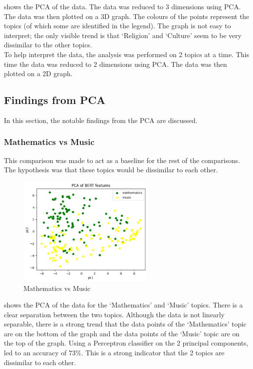  shows the PCA of the data. The data was reduced to 3 dimensions using PCA. The data was then plotted on a 3D
graph. The colours of the points represent the topics (of which some are identified in the legend). The graph is not easy to interpret;
the only visible trend is that `Religion' and `Culture' seem to be very dissimilar to the other topics.\\
To help interpret the data, the analysis was performed on 2 topics at a time. This time the data was reduced to 2 dimensions using
PCA. The data was then plotted on a 2D graph.
\subsection{Findings from PCA}
In this section, the notable findings from the PCA are discussed.
\subsubsection{Mathematics vs Music}
This comparison was made to act as a baseline for the rest of the comparisons. The hypothesis was that these topics would be
dissimilar to each other.
\begin{figure}[hbtp]
    \centering
    \includegraphics[width=0.6\textwidth]{../images/math-vs-music.png}
    \caption{Mathematics vs Music}
    \label{fig:math-vs-music}
\end{figure}

 shows the PCA of the data for the `Mathematics' and `Music' topics. There is a clear separation between
the two topics. Although the data is not linearly separable, there is a strong trend that the data points of the `Mathematics' topic
are on the bottom of the graph and the data points of the `Music' topic are on the top of the graph. Using a Perceptron classifier
on the 2 principal components, led to an accuracy of $73\%$. This is a strong indicator that the 2 topics are dissimilar to each other.
